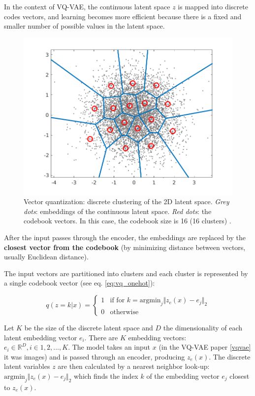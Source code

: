 In the context of VQ-VAE, the continuous latent space $z$ is mapped into discrete codes vectors, and learning becomes more efficient because there is a fixed and smaller number of possible values in the latent space.

\begin{figure}[h]
    \centering
    \includegraphics[scale=0.5]{images/vq_visualization.png}
    \caption{Vector quantization: discrete clustering of the 2D latent space. \textit{Grey dots}: embeddings of the continuous latent space. \textit{Red dots}: the codebook vectors. In this case, the codebook size is 16 (16 clusters) \cite{vq_visualization_website}.}
    \label{fig:vqvae_cluster_visualization}
\end{figure}

After the input passes through the encoder, the embeddings are replaced by the \textbf{closest vector from the codebook} (by minimizing distance between vectors, usually Euclidean distance). 

The input vectors are partitioned into clusters and each cluster is represented by a single codebook vector (see eq. \ref{eq:vq_onehot}):

\begin{equation}
    \label{eq:vq_onehot}
    q(z=k|x) = \begin{cases}
        1 & \text{if } \text{for } k=\text{argmin}_j \Vert z_e(x) - e_j \Vert_2 \\
        0 & \text{otherwise}
    \end{cases}
\end{equation}

Let $K$ be the size of the discrete latent space and $D$ the dimensionality of each latent embedding vector $e_i$. There are $K$ embedding vectors: $e_i \in \mathbb{R}^D, i \in 1, 2, ..., K$. The model takes an input $x$ (in the VQ-VAE paper \ref{vqvae} it was images) and is passed through an encoder, producing $z_e(x)$. The discrete latent variables $z$ are then calculated by a nearest neighbor look-up: $\text{argmin}_j \Vert z_e(x) - e_j \Vert_2$ which finds the index $k$ of the embedding vector $e_j$ closest to $z_e(x)$. 

